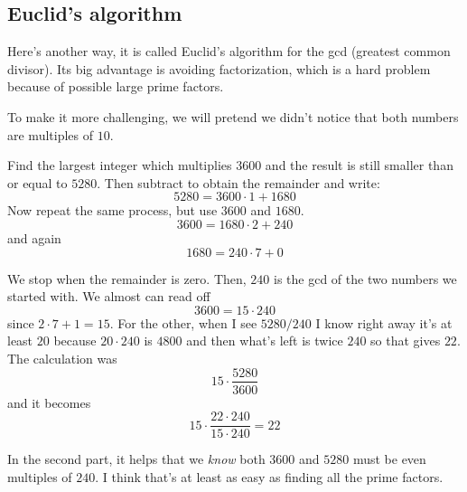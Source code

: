 \documentclass[11pt, oneside]{article}
\begin{document}
\subsection*{Euclid's algorithm}
Here's another way, it is called Euclid's algorithm for the gcd (greatest common divisor).  Its big advantage is avoiding factorization, which is a hard problem because of possible large prime factors.

To make it more challenging, we will pretend we didn't notice that both numbers are multiples of $10$.  

Find the largest integer which multiplies $3600$ and the result is still smaller than or equal to $5280$.  Then subtract to obtain the remainder and write:
\[ 5280 = 3600 \cdot 1 + 1680 \]
Now repeat the same process, but use $3600$ and $1680$.
\[ 3600 = 1680 \cdot 2 + 240 \]
and again
\[ 1680 = 240 \cdot 7 + 0 \]

We stop when the remainder is zero.  Then, $240$ is the gcd of the two numbers we started with.  We almost can read off 
\[ 3600 = 15 \cdot 240 \]
since $2 \cdot 7 + 1 = 15$.  For the other, when I see $5280/240$ I know right away it's at least $20$ because $20 \cdot 240$ is $4800$ and then what's left is twice $240$ so that gives $22$.  The calculation was
\[ 15 \cdot \frac{5280}{3600} \]
and it becomes
\[ 15 \cdot \frac{22 \cdot 240}{15 \cdot 240} = 22 \]

In the second part, it helps that we \emph{know} both $3600$ and $5280$ must be even multiples of $240$.  I think that's at least as easy as finding all the prime factors.
\end{document}

